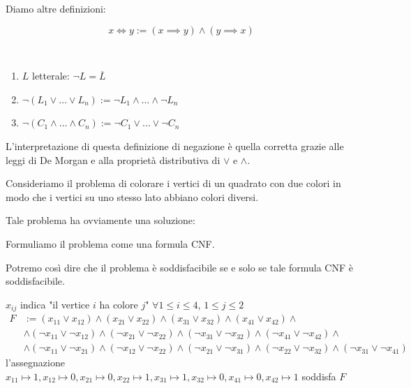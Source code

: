 \documentclass[../main.tex]{subfiles}
\begin{document}
Diamo altre definizioni:
\begin{definition}
    \begin{equation*}
        x \iff y := (x \implies y)\land(y \implies x)
    \end{equation*}
\end{definition}

\begin{definition}\
    \begin{enumerate}
        \item $L$ letterale: $\neg L = \overline{L}$
        \item $\neg (L_1 \lor \ldots \lor L_n) := \neg L_1 \land \ldots \land \neg L_n$
        \item $\neg (C_1 \land \ldots \land C_n) := \neg C_1 \lor \ldots \lor \neg C_n$
    \end{enumerate}
\end{definition}
L'interpretazione di questa definizione di negazione è quella corretta grazie alle leggi di De Morgan e alla proprietà distributiva di $\lor$ e $\land$.
\begin{example}
    Consideriamo il problema di colorare i vertici di un quadrato con due colori in modo che i vertici su uno stesso lato abbiano colori diversi.

    Tale problema ha ovviamente una soluzione:
    \begin{center}
    \end{center}
    Formuliamo il problema come una formula CNF.

    Potremo così dire che il problema è soddisfacibile se e solo se tale formula CNF è soddisfacibile.

    $x_{ij}$ indica "il vertice $i$ ha colore $j$" $\forall 1 \leq i \leq 4$, $1 \leq j \leq 2$
    \begin{align*}
        F & := (x_{11} \lor x_{12}) \land (x_{21} \lor x_{22}) \land (x_{31} \lor x_{32}) \land (x_{41} \lor x_{42}) \land                                                                              \\
          & \land (\neg x_{11} \lor \neg x_{12}) \land ( \neg x_{21} \lor \neg x_{22}) \land ( \neg x_{31} \lor \neg x_{32}) \land ( \neg x_{41} \lor \neg x_{42}) \land                                \\
          & \land (\neg x_{11} \lor \neg x_{21}) \land ( \neg x_{12} \lor \neg x_{22}) \land ( \neg x_{21} \lor \neg x_{31}) \land ( \neg x_{22} \lor \neg x_{32}) \land (\neg x_{31} \lor \neg x_{41})
    \end{align*}
    l'assegnazione $x_{11} \mapsto 1, x_{12} \mapsto 0, x_{21} \mapsto 0, x_{22} \mapsto 1, x_{31} \mapsto 1, x_{32} \mapsto 0, x_{41} \mapsto 0, x_{42} \mapsto 1$ soddisfa $F$
\end{example}
\end{document}
